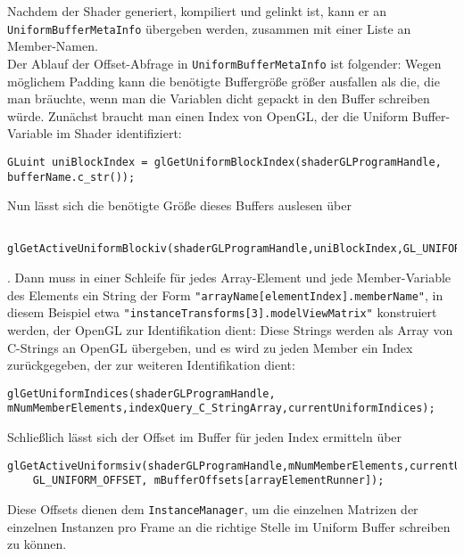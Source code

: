 	Nachdem der Shader generiert, kompiliert und gelinkt ist, kann er an \lstinline|UniformBufferMetaInfo|
	übergeben werden, zusammen mit einer Liste an Member-Namen.\\
	Der Ablauf der Offset-Abfrage in \lstinline|UniformBufferMetaInfo| ist folgender:
	Wegen möglichem Padding kann die benötigte Buffergröße größer ausfallen als die,
	die man bräuchte, wenn man die Variablen dicht gepackt in den Buffer schreiben würde.
	Zunächst braucht man einen Index von OpenGL, der die Uniform Buffer-Variable im Shader identifiziert:
	\begin{lstlisting}
GLuint uniBlockIndex = glGetUniformBlockIndex(shaderGLProgramHandle, bufferName.c_str());
	\end{lstlisting}
	Nun lässt sich die benötigte Größe dieses Buffers auslesen über
\begin{lstlisting}
	glGetActiveUniformBlockiv(shaderGLProgramHandle,uniBlockIndex,GL_UNIFORM_BLOCK_DATA_SIZE,&mRequiredBufferSize);
\end{lstlisting}
	. Dann muss in einer Schleife für jedes Array-Element und jede Member-Variable 
	des Elements ein String der Form \lstinline|"arrayName[elementIndex].memberName"|, in diesem Beispiel
	etwa \lstinline|"instanceTransforms[3].modelViewMatrix"| konstruiert werden,
	der OpenGL zur Identifikation dient: Diese Strings werden als Array von C-Strings
	an OpenGL übergeben, und es wird zu jeden Member ein Index zurückgegeben, der zur weiteren Identifikation dient:
\begin{lstlisting}
glGetUniformIndices(shaderGLProgramHandle, mNumMemberElements,indexQuery_C_StringArray,currentUniformIndices);
\end{lstlisting}	
	Schließlich lässt sich der Offset im Buffer für jeden Index ermitteln über
\begin{lstlisting}
glGetActiveUniformsiv(shaderGLProgramHandle,mNumMemberElements,currentUniformIndices,
	GL_UNIFORM_OFFSET, mBufferOffsets[arrayElementRunner]);
\end{lstlisting}
	
	Diese Offsets dienen dem \lstinline|InstanceManager|, um die einzelnen Matrizen der einzelnen Instanzen
	pro Frame an die richtige Stelle im Uniform Buffer schreiben zu können.
	
